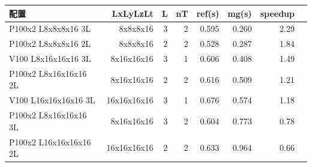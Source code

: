 \begin{tabular}{l|rrrrrrr}
\hline
配置 & LxLyLzLt & L & nT & ref(s) & mg(s) & speedup \\
\hline
P100x2 L8x8x8x16 3L & 8x8x8x16 & 3 & 2 & 0.595 & 0.260 & 2.29 \\
P100x2 L8x8x8x16 2L & 8x8x8x16 & 2 & 2 & 0.528 & 0.287 & 1.84 \\
V100 L8x16x16x16 3L & 8x16x16x16 & 3 & 1 & 0.606 & 0.408 & 1.49 \\
P100x2 L8x16x16x16 2L & 8x16x16x16 & 2 & 2 & 0.616 & 0.509 & 1.21 \\
V100 L16x16x16x16 3L & 16x16x16x16 & 3 & 1 & 0.676 & 0.574 & 1.18 \\
P100x2 L8x16x16x16 3L & 8x16x16x16 & 3 & 2 & 0.604 & 0.773 & 0.78 \\
P100x2 L16x16x16x16 2L & 16x16x16x16 & 2 & 2 & 0.633 & 0.964 & 0.66 \\
\hline
\end{tabular}
